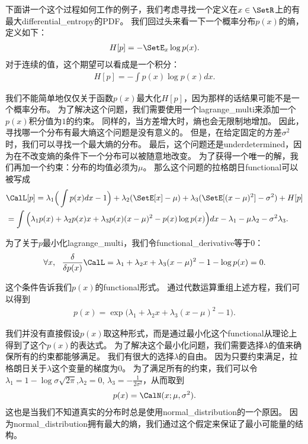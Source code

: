 下面讲一个这个过程如何工作的例子，我们考虑寻找一个定义在$x\in\SetR$上的有最大\gls{differential_entropy}的\gls{PDF}。
我们回过头来看一下一个概率分布$p(x)$的熵，定义如下：
\begin{align}
	H[p] = - \SetE_x \log p(x).
\end{align}
对于连续的值，这个期望可以看成是一个积分：
\begin{align}
	H[p] = - \int p(x) \log p(x) dx.
\end{align}


我们不能简单地仅仅关于函数$p(x)$最大化$H[p]$，因为那样的话结果可能不是一个概率分布。
为了解决这个问题，我们需要使用一个\gls{lagrange_multi}来添加一个$p(x)$积分值为$1$的约束。
同样的，当方差增大时，熵也会无限制地增加。
因此，寻找哪一个分布有最大熵这个问题是没有意义的。
但是，在给定固定的方差$\sigma^2$时，我们可以寻找一个最大熵的分布。
最后，这个问题还是\gls{underdetermined}，因为在不改变熵的条件下一个分布可以被随意地改变。
为了获得一个唯一的解，我们再加一个约束：分布的均值必须为$\mu$。
那么这个问题的拉格朗日\gls{functional}可以被写成
\begin{align}
\label{eqn:1950}
&		\CalL[p] =  \lambda_1 \Big(\int p(x)dx - 1\Big)  + \lambda_2 (\SetE[x] - \mu) +  \lambda_3 (\SetE[(x-\mu)^2] - \sigma^2)  + H[p]\\
& =  \int \Big(\lambda_1 p(x) + \lambda_2 p(x)x + \lambda_3 p(x)(x-\mu)^2 - p(x)\log p(x) \Big)dx - \lambda_1 - \mu \lambda_2 - \sigma^2\lambda_3.
\end{align}


为了关于$p$最小化\gls{lagrange_multi}，我们令\gls{functional_derivative}等于$0$：
\begin{align}
\label{eqn:1952}
	\forall x,\ \  \frac{\delta}{\delta p(x)} \CalL = \lambda_1 + \lambda_2 x + \lambda_3(x-\mu)^2 - 1 - \log p(x) = 0 .
\end{align}


这个条件告诉我们$p(x)$的\gls{functional}形式。
通过代数运算重组上述方程，我们可以得到
\begin{align}
\label{eqn:1953}
	p(x) = \exp\big(\lambda_1 + \lambda_2 x + \lambda_3 (x-\mu)^2  - 1\big).
\end{align}

我们并没有直接假设$p(x)$取这种形式，而是通过最小化这个\gls{functional}从理论上得到了这个$p(x)$的表达式。
为了解决这个最小化问题，我们需要选择$\lambda$的值来确保所有的约束都能够满足。
我们有很大的选择$\lambda$的自由。
因为只要约束满足，拉格朗日关于$\lambda$这个变量的梯度为$0$。
为了满足所有的约束，我们可以令$\lambda_1 = 1 - \log \sigma\sqrt{2\pi}$,$\lambda_2 = 0$, $\lambda_3 = - \frac{1}{2\sigma^2}$，从而取到
\begin{align}
\label{eqn:1954}
	p(x) = \CalN(x;\mu,\sigma^2).
\end{align}
这也是当我们不知道真实的分布时总是使用\gls{normal_distribution}的一个原因。
因为\gls{normal_distribution}拥有最大的熵，我们通过这个假定来保证了最小可能量的结构。



